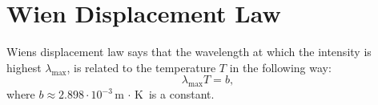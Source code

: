 \section{Wien Displacement Law}
Wiens displacement law says that the wavelength at which the intensity is highest $\lambda_\text{max}$, is related to the temperature $T$ in the following way\autocite[p. 1304]{YoungFreedman2020}:
\begin{equation}
    \lambda_\text{max} T = b,  \label{eq:WienDisplacement}
\end{equation}
where $b \approx 2.898 \cdot 10^{-3} \text{m $\cdot$ K}$ is a constant.
